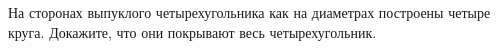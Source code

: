 \begin{ex}
	\begin{condition}
		На сторонах выпуклого четырехугольника как на диаметрах построены четыре круга. Докажите, что они покрывают весь четырехугольник.
	\end{condition}
\end{ex}